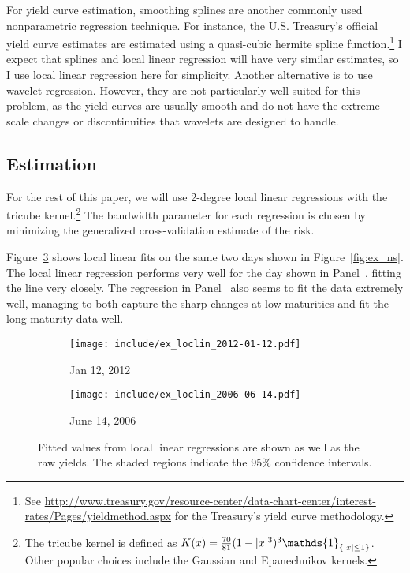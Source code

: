 \documentclass[12pt]{article}
\DeclarePairedDelimiter{\abs}{\lvert}{\rvert}
\newcommand*{\I}{\mathds{1}}
\begin{document}
For yield curve estimation, smoothing splines are another commonly used nonparametric regression technique. For instance, the U.S. Treasury's official yield curve estimates are estimated using a quasi-cubic hermite spline function.\footnote{See \url{http://www.treasury.gov/resource-center/data-chart-center/interest-rates/Pages/yieldmethod.aspx} for the Treasury's yield curve methodology.} I expect that splines and local linear regression will have very similar estimates, so I use local linear regression here for simplicity. Another alternative is to use wavelet regression. However, they are not particularly well-suited for this problem, as the yield curves are usually smooth and do not have the extreme scale changes or discontinuities that wavelets are designed to handle.


\subsection{Estimation}

For the rest of this paper, we will use 2-degree local linear regressions with the tricube kernel.\footnote{The tricube kernel is defined as $K(x) = \frac{70}{81} (1 - \abs{x}^3)^3 \I_{\{\abs{x} \leq 1\}}$. Other popular choices include the Gaussian and Epanechnikov kernels.} The bandwidth parameter for each regression is chosen by minimizing the generalized cross-validation estimate of the risk.

Figure~\ref{fig:ex_loclin} shows local linear fits on the same two days shown in Figure~\ref{fig:ex_ns}. The local linear regression performs very well for the day shown in Panel~, fitting the line very closely. The regression in Panel~ also seems to fit the data extremely well, managing to both capture the sharp changes at low maturities and fit the long maturity data well.

\begin{figure}[htb] \centering
    \begin{subfigure}[t]{.49\linewidth}
        \texttt{[image: include/ex\_loclin\_2012-01-12.pdf]}
        \caption{Jan 12, 2012} \label{fig:ex_loclin_1-12-2012}
    \end{subfigure}
    \begin{subfigure}[t]{.49\linewidth}
        \texttt{[image: include/ex\_loclin\_2006-06-14.pdf]}
        \caption{June 14, 2006} \label{fig:ex_loclin_6-14-2006}
    \end{subfigure}
    \caption{Fitted values from local linear regressions are shown as well as the raw yields. The shaded regions indicate the 95\% confidence intervals.}
    \label{fig:ex_loclin}
\end{figure}
\end{document}
